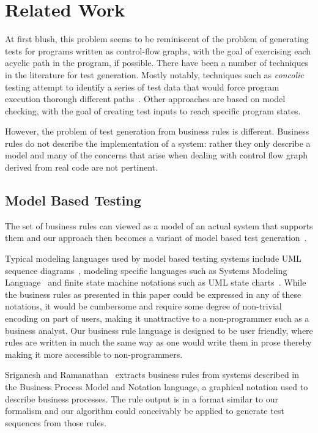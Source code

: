 \section{Related Work}

At first blush, this problem seems to be reminiscent of the problem of
generating tests for programs written as control-flow graphs, with the
goal of exercising each acyclic path in the program, if possible.
There have been a number of techniques in the literature for test
generation. Mostly notably, techniques such as \textit{concolic}
testing attempt to identify a series of test data that would force
program execution thorough different paths~\cite{dart, concolic}.  Other
approaches are based on model checking, with the goal of creating test
inputs to reach specific program states.

However, the problem of test generation from business rules is
different. Business rules do not describe the implementation of a
system: rather they only describe a model and many of the concerns
that arise when dealing with control flow graph derived from real code
are not pertinent.

\subsection{Model Based Testing}

The set of business rules can viewed as a model of an actual system
that supports them and our approach then becomes a variant of model
based test generation~\cite{utting2012}.

Typical modeling languages used by model based testing systems include
UML sequence diagrams~\cite{nayak2009}, modeling specific languages
such as Systems Modeling Language~\cite{friedenthal2011} and
finite state machine notations such as UML state
charts~\cite{offhut99}. While the business rules as presented in this
paper could be expressed in any of these notations, it would be
cumbersome and require some degree of non-trivial encoding on part of
users, making it unattractive to a non-programmer such as a business analyst. Our business
rule language is designed to be user friendly, where rules are written 
in much the same way as one would write them in prose thereby making it more accessible
to non-programmers.

Sriganesh and Ramanathan~\cite{sriganesh2012} extracts business rules
from systems described in the Business Process Model and Notation
language, a graphical notation used to describe business
processes. The rule output is in a format similar to our formalism and
our algorithm could conceivably be applied to generate test sequences
from those rules.

